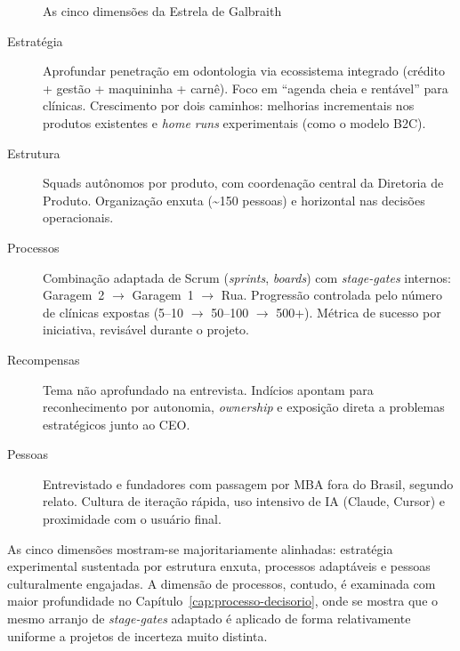\begin{figure}[h]
  \caption{As cinco dimensões da Estrela de Galbraith}
  \label{fig:galbraith-estrela}
  \centering
\end{figure}

\begin{description}
  \item[Estratégia] Aprofundar penetração em odontologia via ecossistema integrado (crédito + gestão + maquininha + carnê). Foco em ``agenda cheia e rentável'' para clínicas. Crescimento por dois caminhos: melhorias incrementais nos produtos existentes e \textit{home runs} experimentais (como o modelo B2C).
  \item[Estrutura] Squads autônomos por produto, com coordenação central da Diretoria de Produto. Organização enxuta (\textasciitilde150 pessoas) e horizontal nas decisões operacionais.
  \item[Processos] Combinação adaptada de Scrum (\textit{sprints}, \textit{boards}) com \textit{stage-gates} internos: Garagem~2 $\rightarrow$ Garagem~1 $\rightarrow$ Rua. Progressão controlada pelo número de clínicas expostas (5--10 $\rightarrow$ 50--100 $\rightarrow$ 500+). Métrica de sucesso por iniciativa, revisável durante o projeto.
  \item[Recompensas] Tema não aprofundado na entrevista. Indícios apontam para reconhecimento por autonomia, \textit{ownership} e exposição direta a problemas estratégicos junto ao CEO.
  \item[Pessoas] Entrevistado e fundadores com passagem por MBA fora do Brasil, segundo relato. Cultura de iteração rápida, uso intensivo de IA (Claude, Cursor) e proximidade com o usuário final.
\end{description}

As cinco dimensões mostram-se majoritariamente alinhadas: estratégia experimental sustentada por estrutura enxuta, processos adaptáveis e pessoas culturalmente engajadas. A dimensão de processos, contudo, é examinada com maior profundidade no Capítulo~\ref{cap:processo-decisorio}, onde se mostra que o mesmo arranjo de \textit{stage-gates} adaptado é aplicado de forma relativamente uniforme a projetos de incerteza muito distinta.

